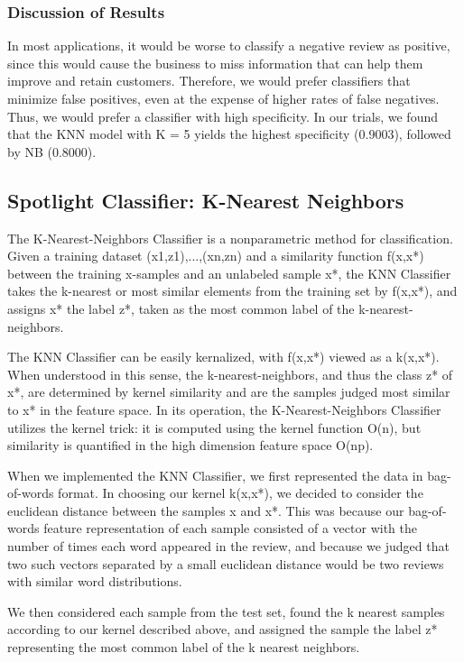 \documentclass{article} %
\begin{document}
\subsubsection*{Discussion of Results}
In most applications, it would be worse to classify a negative review as positive, since this would cause the business to miss information that can help them improve and retain customers. Therefore, we would prefer classifiers that minimize false positives, even at the expense of higher rates of false negatives. Thus, we would prefer a classifier with high specificity. In our trials, we found that the KNN model with K = 5 yields the highest specificity (0.9003), followed by NB (0.8000).

\subsection{Spotlight Classifier: K-Nearest Neighbors}
The K-Nearest-Neighbors Classifier is a nonparametric method for classification. Given a training dataset {(x1,z1),...,(xn,zn)} and a similarity function f(x,x*) between the training x-samples and an unlabeled sample x*, the KNN Classifier takes the k-nearest or most similar elements from the training set by f(x,x*), and assigns x* the label z*, taken as the most common label of the k-nearest-neighbors. 

The KNN Classifier can be easily kernalized, with f(x,x*) viewed as a k(x,x*). When understood in this sense, the k-nearest-neighbors, and thus the class z* of x*, are determined by kernel similarity and are the samples judged most similar to x* in the feature space. In its operation, the K-Nearest-Neighbors Classifier utilizes the kernel trick: it is computed using the kernel function O(n), but similarity is quantified in the high dimension feature space O(np).

When we implemented the KNN Classifier, we first represented the data in bag-of-words format. In choosing our kernel k(x,x*), we decided to consider the euclidean distance between the samples x and x*. This was because our bag-of-words feature representation of each sample consisted of a vector with the number of times each word appeared in the review, and because we judged that two such vectors separated by a small euclidean distance would be two reviews with similar word distributions.

We then considered each sample from the test set, found the k nearest samples according to our kernel described above, and assigned the sample the label z* representing the most common label of the k nearest neighbors. 
\end{document}
